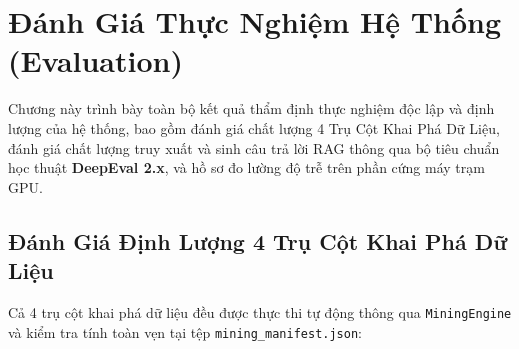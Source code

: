 
\chapter{Đánh Giá Thực Nghiệm Hệ Thống (Evaluation)}
\label{chap:evaluation}

Chương này trình bày toàn bộ kết quả thẩm định thực nghiệm độc lập và định lượng của hệ thống, bao gồm đánh giá chất lượng 4 Trụ Cột Khai Phá Dữ Liệu, đánh giá chất lượng truy xuất và sinh câu trả lời RAG thông qua bộ tiêu chuẩn học thuật \textbf{DeepEval 2.x}, và hồ sơ đo lường độ trễ trên phần cứng máy trạm GPU.

\section{Đánh Giá Định Lượng 4 Trụ Cột Khai Phá Dữ Liệu}

Cả 4 trụ cột khai phá dữ liệu đều được thực thi tự động thông qua \texttt{MiningEngine} và kiểm tra tính toàn vẹn tại tệp \texttt{mining\_manifest.json}:

